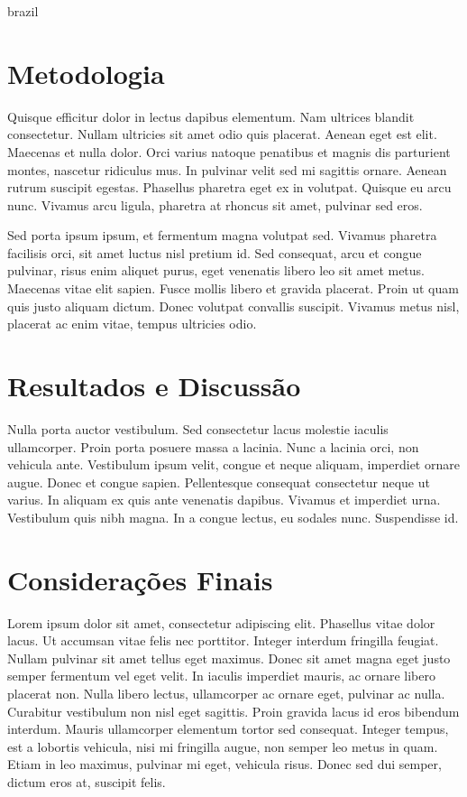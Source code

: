 \begin{otherlanguage*}{brazil}
        \section*{Metodologia}
        Quisque efficitur dolor in lectus dapibus elementum. Nam ultrices blandit consectetur.
        Nullam ultricies sit amet odio quis placerat. Aenean eget est elit. Maecenas et nulla dolor.
        Orci varius natoque penatibus et magnis dis parturient montes, nascetur ridiculus mus. In
        pulvinar velit sed mi sagittis ornare. Aenean rutrum suscipit egestas. Phasellus pharetra
        eget ex in volutpat. Quisque eu arcu nunc. Vivamus arcu ligula, pharetra at rhoncus sit
        amet, pulvinar sed eros.

        Sed porta ipsum ipsum, et fermentum magna volutpat sed. Vivamus
        pharetra facilisis orci, sit amet luctus nisl pretium id. Sed consequat, arcu et congue
        pulvinar, risus enim aliquet purus, eget venenatis libero leo sit amet metus. Maecenas vitae
        elit sapien. Fusce mollis libero et gravida placerat. Proin ut quam quis justo aliquam
        dictum. Donec volutpat convallis suscipit. Vivamus metus nisl, placerat ac enim vitae,
        tempus ultricies odio.

        \section*{Resultados e Discussão}
        Nulla porta auctor vestibulum. Sed
        consectetur lacus molestie iaculis ullamcorper. Proin porta posuere massa a lacinia. Nunc a
        lacinia orci, non vehicula ante. Vestibulum ipsum velit, congue et neque aliquam, imperdiet
        ornare augue. Donec et congue sapien. Pellentesque consequat consectetur neque ut varius. In
        aliquam ex quis ante venenatis dapibus. Vivamus et imperdiet urna. Vestibulum quis nibh
        magna. In a congue lectus, eu sodales nunc. Suspendisse id.

        \section*{Considerações Finais}
        Lorem ipsum dolor sit amet, consectetur adipiscing elit. Phasellus vitae dolor lacus. Ut
        accumsan vitae felis nec porttitor. Integer interdum fringilla feugiat. Nullam pulvinar sit
        amet tellus eget maximus. Donec sit amet magna eget justo semper fermentum vel eget velit.
        In iaculis imperdiet mauris, ac ornare libero placerat non. Nulla libero lectus, ullamcorper
        ac ornare eget, pulvinar ac nulla. Curabitur vestibulum non nisl eget sagittis. Proin
        gravida lacus id eros bibendum interdum. Mauris ullamcorper elementum tortor sed consequat.
        Integer tempus, est a lobortis vehicula, nisi mi fringilla augue, non semper leo metus in
        quam. Etiam in leo maximus, pulvinar mi eget, vehicula risus. Donec sed dui semper, dictum
        eros at, suscipit felis.


\end{otherlanguage*}
